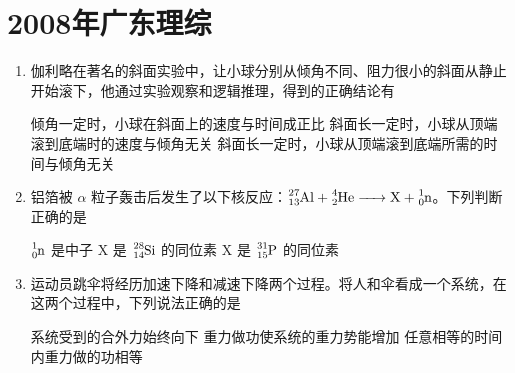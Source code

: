 \documentclass[\gkver]{gaokaozhenti}
\begin{document}
\chapter{2008年广东理综}

\begin{enumerate}
\item
伽利略在著名的斜面实验中，让小球分别从倾角不同、阻力很小的斜面从静止开始滚下，他通过实验观察和逻辑推理，得到的正确结论有

{倾角一定时，小球在斜面上的速度与时间成正比}
{斜面长一定时，小球从顶端滚到底端时的速度与倾角无关}
{斜面长一定时，小球从顶端滚到底端所需的时间与倾角无关}


\item
铝箔被 $\alpha$ 粒子轰击后发生了以下核反应：$\ce{^{27}_{13}Al + ^{4}_{2}He -> X + ^{1}_{0}n}$。下列判断正确的是

{$\ce{^{1}_{0}n}$ 是中子}
{X 是 $\ce{^{28}_{14}Si}$ 的同位素}
{X 是 $\ce{^{31}_{15}P}$ 的同位素}


\item
运动员跳伞将经历加速下降和减速下降两个过程。将人和伞看成一个系统，在这两个过程中，下列说法正确的是

{系统受到的合外力始终向下}
{重力做功使系统的重力势能增加}
{任意相等的时间内重力做的功相等}



\end{enumerate}
\end{document}
